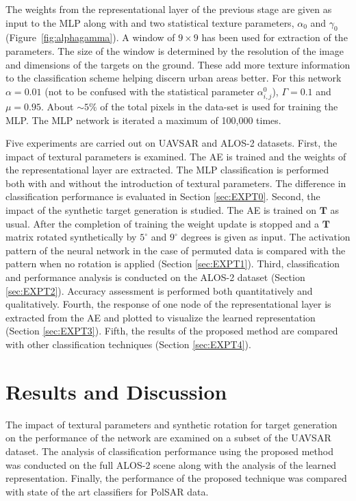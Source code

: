 The  weights from the representational layer of the previous stage are given as input to the MLP along with and two statistical texture parameters, $\alpha_0$ and $\gamma_0$ (Figure~\ref{fig:alphagamma}).
A window of $9\times9$ has been used for extraction of the parameters. The size of the window is determined by the resolution of the image and dimensions of the targets on the ground. These add more texture information to the classification scheme helping discern urban areas better.  For this network $\alpha=0.01$ (not to be confused with the statistical parameter $\alpha^0_{i,j}$), $\Gamma = 0.1$ and $\mu = 0.95$. About $\sim 5\%$ of the total pixels in the data-set is used for training the MLP. The MLP network is iterated a maximum of 100,000 times.


 



Five experiments are carried out on UAVSAR and ALOS-2 datasets. First, the impact of textural parameters is examined. The AE is trained and the weights of the representational layer are extracted. The MLP classification is performed both with and without the introduction of textural parameters. The difference in classification performance is evaluated in Section \ref{sec:EXPT0}. Second, the impact of the synthetic target generation is studied. The AE is trained on $\mathbf{T}$ as usual. After the completion of training the weight update is stopped and a $\mathbf{T}$ matrix rotated synthetically by $5^\circ$ and $9^\circ$ degrees is given as input. The activation pattern of the neural network in the case of permuted data is compared with the pattern when no rotation is applied (Section \ref{sec:EXPT1}).
Third, classification and performance analysis is conducted on the ALOS-2 dataset (Section \ref{sec:EXPT2}). Accuracy assessment is performed both quantitatively and qualitatively. Fourth, the response of one node of the representational layer is extracted from the AE and plotted to visualize the learned representation  (Section \ref{sec:EXPT3}). Fifth, the results of the proposed method are compared with other classification techniques (Section \ref{sec:EXPT4}).





\section{Results and Discussion}
\label{ref:results1}


The impact of textural parameters and synthetic rotation for target generation on the performance of the network are examined on a subset of the UAVSAR dataset. The analysis of classification performance using the proposed method was conducted on the full ALOS-2 scene along with the analysis of the learned representation. Finally, the performance of the proposed technique was compared with state of the art classifiers for PolSAR data. 


